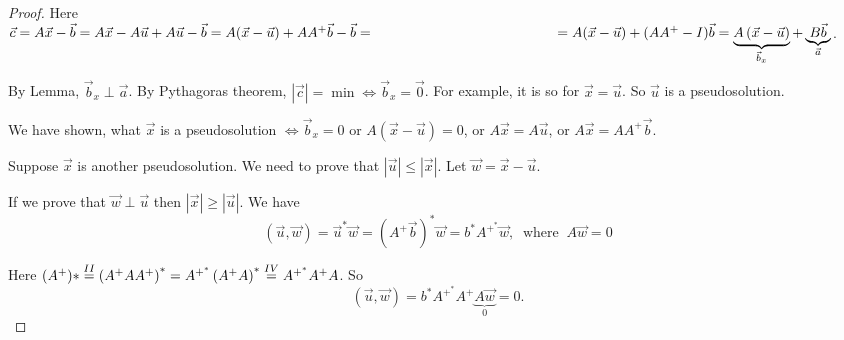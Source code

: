 \begin{proof}
Here $\vec{c} = A\vec{x} - \vec{b} = A\vec{x} - A\vec{u} + A\vec{u} - \vec{b} = A(\vec{x} - \vec{u}) + AA^+\vec{b} - \vec{b} = \\ \hspace*{4.5cm} = A(\vec{x} - \vec{u}) + (AA^+-I)\vec{b} = \underbrace{A\left(\vec{x} - \vec{u}\right)}_{\vec{b}_x} + \underbrace{B\vec{b}}_{\vec{a}}$.
\par 
By Lemma, $\vec{b}_x \perp \vec{a}$. By Pythagoras theorem, $|\vec{c}| = \min \Longleftrightarrow \vec{b}_x = \vec{0}$. For example, it is so for $\vec{x} = \vec{u}$. So $\vec{u}$ is a pseudosolution.
\par
We have shown, what $\vec{x}$ is a pseudosolution $\Longleftrightarrow \vec{b}_x = 0$ or $A(\vec{x} - \vec{u}) = 0$, or $A\vec{x} = A\vec{u}$, or $A\vec{x} = AA^+\vec{b}$. 
\par
Suppose $\vec{x}$ is another pseudosolution. We need to prove that $|\vec{u}| \leq |\vec{x}|$. Let $\vec{w} = \vec{x} - \vec{u}$.
\par
\begin{figure}
    \hspace*{1.5cm} 
\end{figure} 
If we prove that $\vec{w}\perp \vec{u}$ then $|\vec{x}| \geq |\vec{u}|$. We have 
\[
  \left(\vec{u}, \vec{w}\right) = \vec{u}^* \vec{w} = (A^+\vec{b})^* \vec{w} = b^*A^{+^*} \vec{w}, \ \text{ where }\ A\vec{w} = 0
\]
\par
Here $(A^+)* \overset{\rom{2}}{=} \left(A^+AA^+\right)^* = A^{+^*}\left(A^+A\right)^* \overset{\rom{4}}{=} A^{+^*}A^+A$. So 
\[(\vec{u}, \vec{w}) = b^*A^{+^*}A^+\underbrace{A\vec{w}}_{0} = 0.\]
\end{proof}
